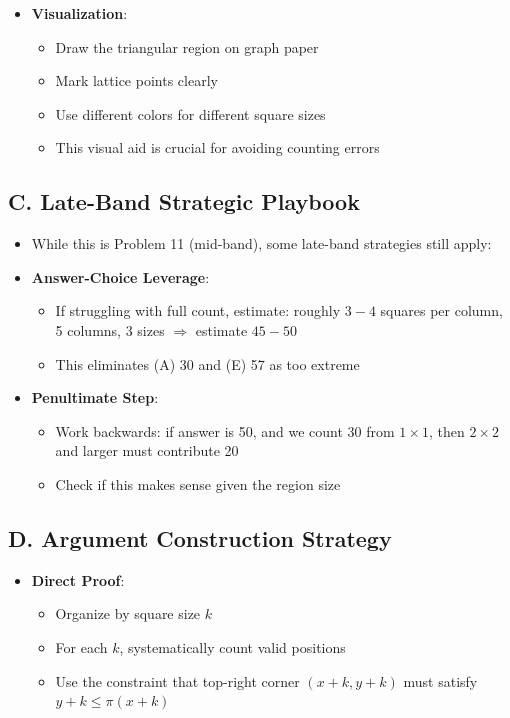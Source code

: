 \documentclass[12pt]{article}
\begin{document}
\begin{strategicbox}
\begin{itemize}[leftmargin=*]
    \item \textbf{Visualization}: 
    \begin{itemize}
        \item Draw the triangular region on graph paper
        \item Mark lattice points clearly
        \item Use different colors for different square sizes
        \item This visual aid is crucial for avoiding counting errors
    \end{itemize}
\end{itemize}

\subsection*{C. Late-Band Strategic Playbook}
\begin{itemize}[leftmargin=*]
    \item While this is Problem 11 (mid-band), some late-band strategies still apply:
    
    \item \textbf{Answer-Choice Leverage}: 
    \begin{itemize}
        \item If struggling with full count, estimate: roughly $3-4$ squares per column, 5 columns, 3 sizes $\Rightarrow$ estimate $45-50$
        \item This eliminates (A) 30 and (E) 57 as too extreme
    \end{itemize}
    
    \item \textbf{Penultimate Step}: 
    \begin{itemize}
        \item Work backwards: if answer is 50, and we count 30 from $1 \times 1$, then $2 \times 2$ and larger must contribute 20
        \item Check if this makes sense given the region size
    \end{itemize}
\end{itemize}

\subsection*{D. Argument Construction Strategy}
\begin{itemize}[leftmargin=*]
    \item \textbf{Direct Proof}: 
    \begin{itemize}
        \item Organize by square size $k$
        \item For each $k$, systematically count valid positions
        \item Use the constraint that top-right corner $(x+k, y+k)$ must satisfy $y+k \leq \pi(x+k)$
    \end{itemize}
    

\end{itemize}
\end{strategicbox}
\end{document}
